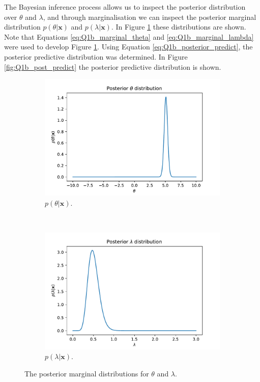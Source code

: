 \documentclass{article}
\begin{document}
The Bayesian inference process allows us to inspect the posterior distribution over $\theta$ and $\lambda$, and through marginalisation we can inspect the posterior marginal distribution $p(\theta \vert \mathbf{x})$ and $p(\lambda \vert \mathbf{x})$. In Figure \ref{fig:Q1b_marginals} these distributions are shown. Note that Equations \eqref{eq:Q1b_marginal_theta} and \eqref{eq:Q1b_marginal_lambda} were used to develop Figure \ref{fig:Q1b_marginals}. Using Equation \eqref{eq:Q1b_posterior_predict}, the posterior predictive distribution was determined. In Figure \ref{fig:Q1b_post_predict} the posterior predictive distribution is shown. 
\begin{figure}[htb!]
     \centering
     \begin{subfigure}[b]{0.45\textwidth}
         \centering
         \includegraphics[width=\textwidth]{Q1b_12.pdf}
         \caption{$p(\theta \vert \mathbf{x})$.}
     \end{subfigure}
     ~
     \begin{subfigure}[b]{0.45\textwidth}
         \centering
         \includegraphics[width=\textwidth]{Q1b_13.pdf}
         \caption{$p(\lambda \vert \mathbf{x})$.}
     \end{subfigure}
     
     \caption{The posterior marginal distributions for $\theta$ and $\lambda$.}
     \label{fig:Q1b_marginals}
\end{figure}
\end{document}
